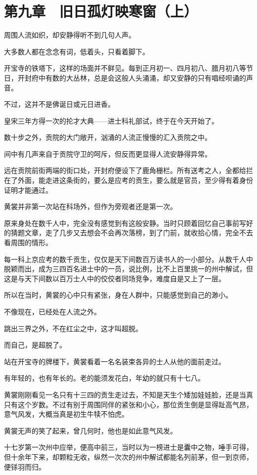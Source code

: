 \section{第九章　旧日孤灯映寒窗（上）}

周围人流如织，却安静得听不到几句人声。

大多数人都在念念有词，低着头，只看着脚下。

开宝寺的铁塔下，这样的场面并不鲜见。每到正月初一、四月初八、腊月初八等节日，开封府中有数的大丛林，总是会这般人头涌涌，却又安静的只有唱经呗诵的声音。

不过，这并不是佛诞日或元日进香。

皇宋三年方得一次的抡才大典——进士科礼部试，终于在今天开始了。

数十步之外，贡院的大门敞开，汹涌的人流正慢慢的汇入贡院之中。

间中有几声来自于贡院守卫的呵斥，但反而更显得人流安静得异常。

远在贡院前街两端的街口处，开封府便设下了鹿角栅栏。所有送考之人，全都给拦在了外面，能走进这条街的，要么是应考的贡生，要么就是官员，至少得有着身份证明才能通过。

黄裳并非第一次站在科场外，但作为旁观者还是第一次。

原来身处在数千人中，完全没有感觉到有这般安静。当时只顾着回忆自己事前写好的猜题文章，走了几步又去想会不会再次落榜，到了门前，就收拾心情，完全不去看周围的情形。

每一科上京应考的数千贡生，仅仅是天下间数百万读书人的一小部分。从数千人中脱颖而出，成为三四百名进士中的一员，说比例，比不上百里挑一的州中解试，但这是与天下间数以百万士人中的佼佼者同场竞争，难度自是又上了一层。

所以在当时，黄裳的心中只有紧张，身在人群中，只能感觉到自己的渺小。

不像现在，已经处在人流之外。

跳出三界之外，不在红尘之中，这才叫超脱。

而自己，是超脱了。

站在开宝寺的牌楼下，黄裳看着一名名装束各异的士人从他的面前走过。

有年轻的，也有年长的。老的能须发花白，年幼的就只有十七八。

黄裳刚刚看见一名只有十三四的贡生走过去，不知是天生个矮加娃娃脸，还是当真只有这个岁数。不过有别于周围同伴的紧张和小心，那位贡生倒是显得趾高气昂，意气风发，大概当真是初生牛犊不怕虎。

黄裳无声的笑了起来，曾几何时，他也是如此意气风发。

十七岁第一次州中应举，便高中前三，当时以为一榜进士是囊中之物，唾手可得，但十余年下来，却颗粒无收，纵然一次次的州中解试都能名列前茅，但一到京师，便铩羽而归。

